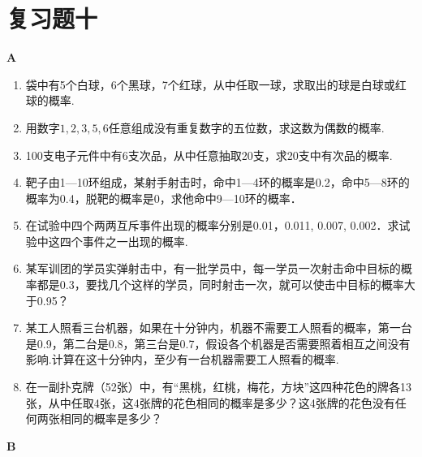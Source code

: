 \section*{复习题十}
\begin{center}
    \bfseries A
\end{center}
\begin{enumerate}
\item 袋中有5个白球，6个黑球，7个红球，从中任取一球，求取出的球是白球或红球的概率.
\item 用数字$1,2,3,5,6$任意组成没有重复数字的五位数，求这数为偶数的概率.
\item 100支电子元件中有6支次品，从中任意抽取20支，求20支中有次品的概率.
\item 靶子由1—10环组成，某射手射击时，命中1—4环的概率是0.2，命中5—8环的概率为0.4，脱靶的概率是0，求他命中9—10环的概率．
\item 在试验中四个两两互斥事件出现的概率分别是0.01，0.011, 0.007, 0.002．求试验中这四个事件之一出现的概率.
\item 某军训团的学员实弹射击中，有一批学员中，每一学员一次射击命中目标的概率都是0.3，要找几个这样的学员，同时射击一次，就可以使击中目标的概率大于0.95？
\item 某工人照看三台机器，如果在十分钟内，机器不需要工人照看的概率，第一台是0.9，第二台是0.8，第三台是0.7，假设各个机器是否需要照着相互之间没有影响.计算在这十分钟内，至少有一台机器需要工人照看的概率.
\item 在一副扑克牌（52张）中，有“黑桃，红桃，梅花，方块”这四种花色的牌各13张，从中任取4张，这4张牌的花色相同的概率是多少？这4张牌的花色没有任何两张相同的概率是多少？
\end{enumerate}

\begin{center}
    \bfseries B
\end{center}

